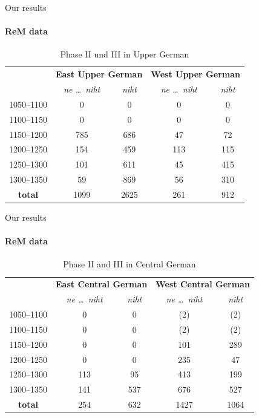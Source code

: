 \documentclass[xcolor=table, compress, %
handout
]{beamer}
\begin{document}
\begin{frame}{Our results}
\framesubtitle{ReM data}

\begin{table}
\begin{center}
\begin{tabular}{c c c c c}
\toprule
& \multicolumn{2}{c}{\textbf{East Upper German}} & \multicolumn{2}{c}{\textbf{West Upper German}}   \\
\cmidrule{2-3}
\cmidrule{4-5}
 & \textit{ne \ldots\ niht} & \textit{niht}  & \textit{ne \ldots\ niht}  & \textit{niht}  \\
\hline
1050–1100 & 0 & 0 & 0 & 0 \\
\hline
1100–1150 & 0 & 0 & 0 & 0 \\
\hline
\alert{1150–1200} & \alert{785} & \alert{686} & 47 & 72 \\
\hline
1200–1250 & 154 & 459 & 113 & 115 \\
\hline
1250–1300 & 101 & 611 & 45 & 415\\
\hline
1300–1350 & 59 & 869 & 56 & 310 \\
\hline
\textbf{total} & 1099 & 2625 & 261 & 912\\
\bottomrule
\end{tabular}
\end{center}
\caption{Phase II und III in Upper German }
\end{table}

\end{frame}


\begin{frame}{Our results}
\framesubtitle{ReM data}

\begin{table}
\begin{center}
\begin{tabular}{c c c c c}
\toprule
& \multicolumn{2}{c}{\textbf{East Central German}} & \multicolumn{2}{c}{\textbf{West Central German}}   \\
\cmidrule{2-3}
\cmidrule{4-5}
 & \textit{ne \ldots\ niht} & \textit{niht}  & \textit{ne \ldots\ niht}  & \textit{niht}  \\
\hline
1050–1100 & 0 & 0 & (2) & (2)\\
\hline
1100–1150 & 0 & 0 & (2) & (2)\\
\hline
1150–1200 & 0 & 0 & 101 & 289\\
\hline
1200–1250 & 0 & 0 & 235 & 47\\
\hline
1250–1300 & \alert{113} & \alert{95} & 413 & 199\\
\hline
1300–1350 & \alert{141} & \alert{537} & 676 & 527\\
\hline
\textbf{total} & 254 & 632 & 1427 & 1064\\
\bottomrule
\end{tabular}
\end{center}
\caption{Phase II and III in Central German}
\end{table}
\end{frame}
\end{document}
